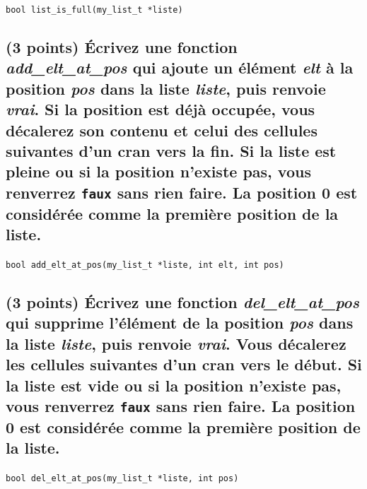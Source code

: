 \documentclass[11pt,a4paper]{article}
\begin{document}
\begin{center}
\end{center}

\medskip

\texttt{bool list\_is\_full(my\_list\_t *liste)}

\begin{center}
\end{center}

\vfillLast

\newpage

\subsection{(3 points) \'Ecrivez une fonction \og \textit{add\_elt\_at\_pos} \fg{} qui ajoute un élément \textit{elt} à la position \textit{pos} dans la liste \textit{liste}, puis renvoie \textit{vrai}. Si la position est déjà occupée, vous décalerez son contenu et celui des cellules suivantes d'un cran vers la fin. Si la liste est pleine ou si la position n'existe pas, vous renverrez \texttt{faux} sans rien faire. La position 0 est considérée comme la première position de la liste. }

\bigskip

\texttt{bool add\_elt\_at\_pos(my\_list\_t *liste, int elt, int pos)}

\begin{center}
\end{center}

\newpage

\subsection{(3 points) \'Ecrivez une fonction \og \textit{del\_elt\_at\_pos} \fg{} qui supprime l'élément de la position \textit{pos} dans la liste \textit{liste}, puis renvoie \textit{vrai}. Vous décalerez les cellules suivantes d'un cran vers le début. Si la liste est vide ou si la position n'existe pas, vous renverrez \texttt{faux} sans rien faire. La position 0 est considérée comme la première position de la liste. }

\bigskip

\texttt{bool del\_elt\_at\_pos(my\_list\_t *liste, int pos)}

\begin{center}
\end{center}
\end{document}
